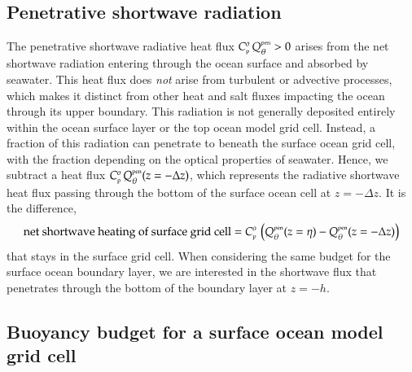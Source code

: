 \subsection{Penetrative shortwave radiation} 
\label{subsection:pen-buoyancy-fluxes}

The penetrative shortwave radiative heat flux $C_{\mbox{\tiny p}}^{o} \,
Q_{\theta}^{\mbox{\tiny pen}} > 0$ arises from the net shortwave
radiation entering through the ocean surface and absorbed by seawater.
This heat flux does {\it not} arise from turbulent or advective
processes, which makes it distinct from other heat and salt fluxes
impacting the ocean through its upper boundary.  This radiation is not
generally deposited entirely within the ocean surface layer or the top
ocean model grid cell. Instead, a fraction of this radiation can
penetrate to beneath the surface ocean grid cell, with the fraction
depending on the optical properties of seawater.  Hence, we subtract a
heat flux $C_{\mbox{\tiny p}}^{o} \, Q_{\theta}^{\mbox{\tiny pen}}(z=-\Delta z)$, which
represents the radiative shortwave heat flux passing through the
bottom of the surface ocean cell at $z=-\Delta z$.  It is the
difference,
\begin{equation}
   \mbox{net shortwave heating of surface grid cell} = 
  C_{\mbox{\tiny p}}^{o} \, \left( Q_{\theta}^{\mbox{\tiny pen}}(z=\eta) 
                    -Q_{\theta}^{\mbox{\tiny pen}}(z=-\Delta z) \right)
\end{equation}
that stays in the surface grid cell.  When considering the same budget
for the surface ocean boundary layer, we are interested in the
shortwave flux that penetrates through the bottom of the boundary
layer at $z=-h$.


\subsection{Buoyancy budget for a surface ocean model grid cell}

